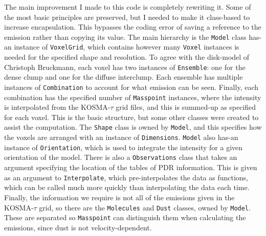 \documentclass[onecolumn]{article}
\begin{document}
  The main improvement I made to this code is completely rewriting it. Some of the most basic principles are preserved, but I needed to make it class-based to increase encapsulation. This bypasses the coding error of saving a reference to the emission rather than copying its value. The main hierarchy is the \texttt{Model} class has-an instance of \texttt{VoxelGrid}, which contains however many \texttt{Voxel} instances is needed for the specified shape and resolution. To agree with the disk-model of Christoph Bruckmann, each voxel has two instances of \texttt{Ensemble}: one for the dense clump and one for the diffuse interclump. Each ensemble has multiple instances of \texttt{Combination} to account for what emission can be seen. Finally, each combination has the specified number of \texttt{Masspoint} instances, where the intensity is interpolated from the KOSMA-$\tau$ grid files, and this is summed-up as specified for each voxel. This is the basic structure, but some other classes were created to assist the computation. The \texttt{Shape} class is owned by \texttt{Model}, and this specifies how the voxels are arranged with an instance of \texttt{Dimensions}. \texttt{Model} also has-an instance of \texttt{Orientation}, which is used to integrate the intensity for a given orientation of the model. There is also a \texttt{Observations} class that takes an argument specifying the location of the tables of PDR information. This is given as an argument to \texttt{Interpolate}, which pre-interpolates the data as functions, which can be called much more quickly than interpolating the data each time. Finally, the information we require is not all of the emissions given in the KOSMA-$\tau$ grid, so there are the \texttt{Molecules} and \texttt{Dust} classes, owned by \texttt{Model}. These are separated so \texttt{Masspoint} can distinguish them when calculating the emissions, since dust is not velocity-dependent.
\end{document}
